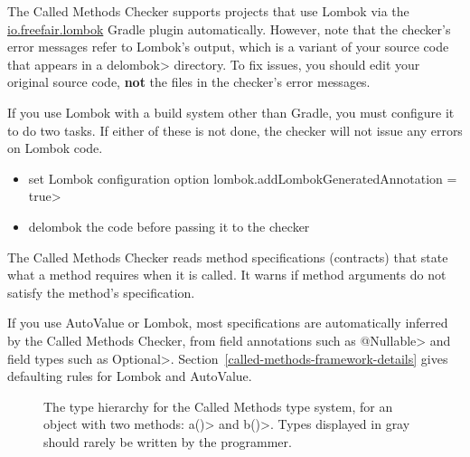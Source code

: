 
The Called Methods Checker supports projects that use Lombok via
the \href{https://plugins.gradle.org/plugin/io.freefair.lombok}{io.freefair.lombok} Gradle plugin automatically.
However, note that the checker's error messages refer to Lombok's output, which is a variant of your source code
that appears in a \<delombok> directory.
To fix issues, you should edit your original source code, \textbf{not} the files in the checker's error messages.

If you use Lombok with a build system other than Gradle, you must configure it to do two tasks.
If either of these is not done, the checker will not issue any errors on Lombok code.
\begin{itemize}
\item set Lombok configuration option \<lombok.addLombokGeneratedAnnotation = true>
\item delombok the code before passing it to the checker
\end{itemize}



The Called Methods Checker reads method specifications (contracts) that
state what a method requires when it is called.  It warns if method
arguments do not satisfy the method's specification.

If you use AutoValue or Lombok, most specifications are automatically
inferred by the Called Methods Checker, from field annotations such as
\<@Nullable> and field types such as
\<Optional>. Section~\ref{called-methods-framework-details} gives
defaulting rules for Lombok and AutoValue.

\begin{figure}
\begin{center}
  \hfill
  \hfill
\end{center}
  \caption{The type hierarchy for the Called Methods type system, for an object with two methods: \<a()> and \<b()>.
  Types displayed in gray should rarely be written by the programmer.}
  \label{fig-called-methods-types}
\end{figure}

